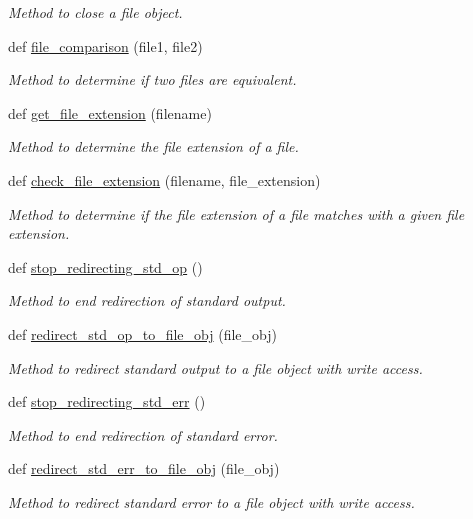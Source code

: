 \begin{DoxyCompactItemize}
\begin{DoxyCompactList}\small\item\em Method to close a file object. \end{DoxyCompactList}\item 
def \hyperlink{classutilities_1_1file__io_1_1file__io__operations_a9b3808ff6b165f5e73b780036f73a917}{file\+\_\+comparison} (file1, file2)
\begin{DoxyCompactList}\small\item\em Method to determine if two files are equivalent. \end{DoxyCompactList}\item 
def \hyperlink{classutilities_1_1file__io_1_1file__io__operations_a7e3cbb46884ca64a14cd367b1e625082}{get\+\_\+file\+\_\+extension} (filename)
\begin{DoxyCompactList}\small\item\em Method to determine the file extension of a file. \end{DoxyCompactList}\item 
def \hyperlink{classutilities_1_1file__io_1_1file__io__operations_a902e9fd0dc0da35e3b374deae44051c6}{check\+\_\+file\+\_\+extension} (filename, file\+\_\+extension)
\begin{DoxyCompactList}\small\item\em Method to determine if the file extension of a file matches with a given file extension. \end{DoxyCompactList}\item 
def \hyperlink{classutilities_1_1file__io_1_1file__io__operations_afc81e06fe5b168f0ca2baf3f3cf5f449}{stop\+\_\+redirecting\+\_\+std\+\_\+op} ()
\begin{DoxyCompactList}\small\item\em Method to end redirection of standard output. \end{DoxyCompactList}\item 
def \hyperlink{classutilities_1_1file__io_1_1file__io__operations_a9ebd9b8cca3921274c4777ec7073c23f}{redirect\+\_\+std\+\_\+op\+\_\+to\+\_\+file\+\_\+obj} (file\+\_\+obj)
\begin{DoxyCompactList}\small\item\em Method to redirect standard output to a file object with write access. \end{DoxyCompactList}\item 
def \hyperlink{classutilities_1_1file__io_1_1file__io__operations_abc05dc3f53dc62bfe62aa316219b9807}{stop\+\_\+redirecting\+\_\+std\+\_\+err} ()
\begin{DoxyCompactList}\small\item\em Method to end redirection of standard error. \end{DoxyCompactList}\item 
def \hyperlink{classutilities_1_1file__io_1_1file__io__operations_a992b70cc7eeaafbe03fe5deb6a9f95d5}{redirect\+\_\+std\+\_\+err\+\_\+to\+\_\+file\+\_\+obj} (file\+\_\+obj)
\begin{DoxyCompactList}\small\item\em Method to redirect standard error to a file object with write access. \end{DoxyCompactList}\end{DoxyCompactItemize}
